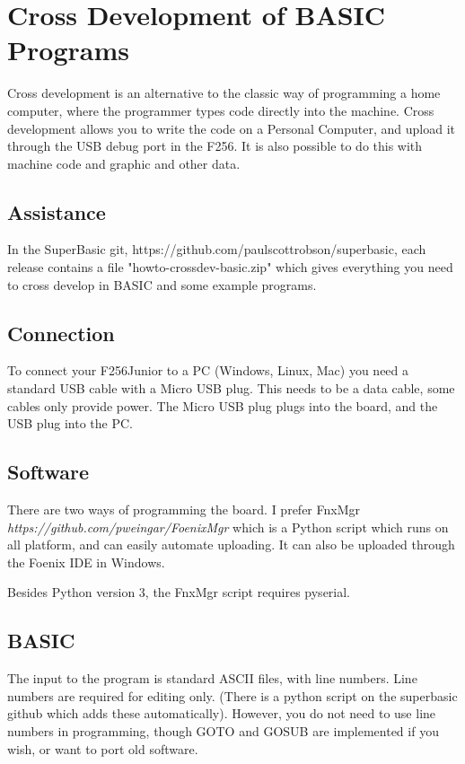 \chapter{Cross Development of BASIC Programs}

Cross development is an alternative to the classic way of programming a home computer, where the programmer types code directly into the machine. Cross development allows you to write the code on a Personal Computer, and upload it through the USB debug port in the F256. It is also possible to do this with machine code and graphic and other data.

\section{Assistance}

In the SuperBasic git, https://github.com/paulscottrobson/superbasic, each release contains a file "howto-crossdev-basic.zip" which gives everything you need to cross develop in BASIC and some example programs.

\section{Connection}

To connect your F256Junior to a PC (Windows, Linux, Mac) you need a standard USB cable with a Micro USB plug. This needs to be a data cable, some cables only provide power. The Micro USB plug plugs into the board, and the USB plug into the PC.

\section{Software}

There are two ways of programming the board. I prefer FnxMgr \emph{https://github.com/pweingar/FoenixMgr} which is a Python script which runs on all platform, and can easily automate uploading. It can also be uploaded through the Foenix IDE in Windows\underline{}.

Besides Python version 3, the FnxMgr script requires pyserial.

\section{BASIC}

The input to the program is standard ASCII files, with line numbers. Line numbers are required for editing only. (There is a python script on the superbasic github which adds these automatically). However, you do not need to use line numbers in programming, though GOTO and GOSUB are implemented if you wish, or want to port old software.

